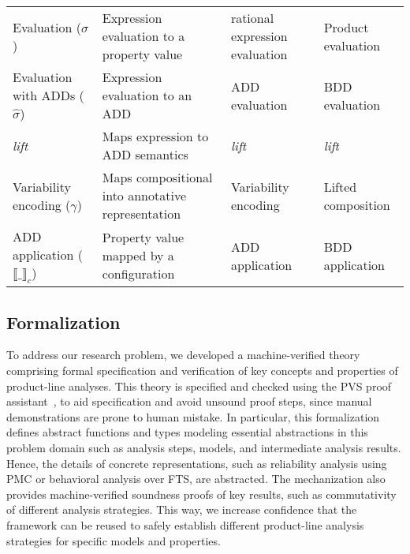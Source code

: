\begin{table}[htb]
{\begin{tabular}{llll}
Evaluation ($\sigma$) & Expression evaluation to a property value &	rational expression	evaluation  & Product evaluation \\
Evaluation with ADDs ($\hat{\sigma}$)  & Expression evaluation to an ADD &			  ADD evaluation  & BDD evaluation \\
\textit{lift} & Maps expression to ADD semantics &			  \textit{lift} & \textit{lift} \\
Variability encoding ($\gamma$) & Maps compositional into annotative representation &			  Variability encoding  & Lifted composition \\
ADD application ($\llbracket \_ \rrbracket_c$) & Property value mapped by a configuration &			  ADD application   & BDD application \\
			  
			\bottomrule
		\end{tabular}
	}
	\label{table:analysis-abstraction-framework}
\end{table}

\subsection{Formalization}
\label{sec:abstraction-description}

To address our research problem, we developed a machine-verified theory comprising formal specification and verification of key concepts and properties of product-line analyses.
This theory is specified and checked using the PVS proof assistant~\cite{PVS:language}, to aid specification and avoid unsound proof steps, since manual demonstrations are prone to human mistake.
In particular, this formalization defines abstract functions and types modeling essential abstractions in this problem domain such as analysis steps, models, and intermediate analysis results.
Hence, the details of concrete representations, such as reliability analysis using PMC or behavioral analysis over FTS, are abstracted.
The mechanization also provides machine-verified soundness proofs of key results, such as commutativity of different analysis strategies.
This way, we increase confidence that the framework can be reused to safely establish different product-line analysis strategies for specific models and properties.


